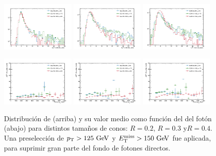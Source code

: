 \begin{figure}[!htbp]

  \centering
  \includegraphics[width=0.32\textwidth]{figures/iso_20}
  \includegraphics[width=0.32\textwidth]{figures/iso_30}
  \includegraphics[width=0.32\textwidth]{figures/iso_40}

  \includegraphics[width=0.32\textwidth]{figures/iso_20_pt}
  \includegraphics[width=0.32\textwidth]{figures/iso_30_pt}
  \includegraphics[width=0.32\textwidth]{figures/iso_40_pt}

  \caption{Distribución de {\etiso} (arriba) y su valor medio como función del
    {\pt} del fotón (abajo) para distintos tamaños de conos: $R=0.2$, $R=0.3$ y$R=0.4$.
    Una preselección de $\pt>125\gev$ y $\met>150\gev$ fue aplicada, para suprimir
    gran parte del fondo de fotones directos.}
  \label{fig:photon_iso}
\end{figure}


